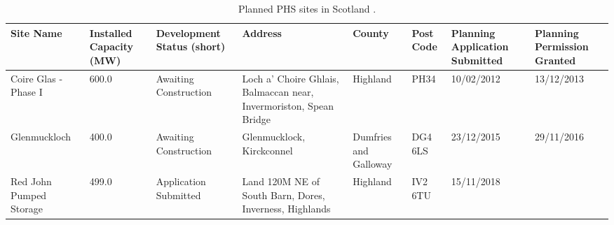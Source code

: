 \begin{table}[htbp]
	\caption{Planned PHS sites in Scotland \citep{BEIS2018PlanningDatabase}.}
	\label{tbl:planned_phs}
	\centering
	\begin{tabular}{@{}llllllll@{}}
		\toprule
		Site Name & Installed Capacity (MW) & Development Status (short) & Address & County & Post Code & Planning Application Submitted & Planning Permission Granted \\ \midrule
		Coire Glas - Phase I & 600.0 & Awaiting Construction & Loch a' Choire Ghlais, Balmaccan near, Invermoriston, Spean Bridge & Highland & PH34 & 10/02/2012 & 13/12/2013 \\
		Glenmuckloch & 400.0 & Awaiting Construction & Glenmucklock, Kirckconnel & Dumfries and Galloway & DG4 6LS & 23/12/2015 & 29/11/2016 \\
		Red John Pumped Storage & 499.0 & Application Submitted & Land 120M NE of South Barn, Dores, Inverness, Highlands & Highland & IV2 6TU & 15/11/2018 &  \\ \bottomrule
	\end{tabular}
\end{table}